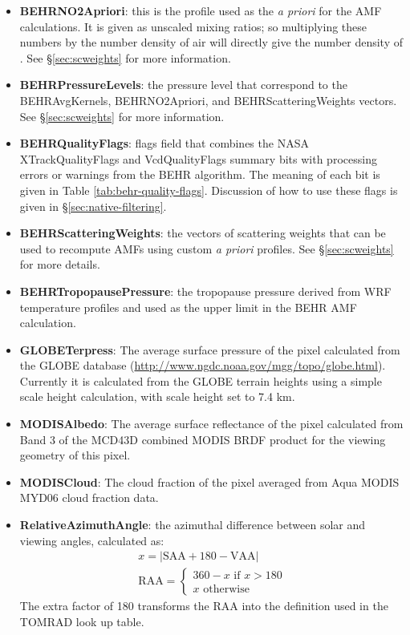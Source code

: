 \documentclass[12pt]{article}
\begin{document}
\begin{itemize}
	\item \textbf{BEHRNO2Apriori}: this is the  profile used as the \emph{a priori} for the AMF calculations. It is given as unscaled mixing ratios; so multiplying these numbers by the number density of air will directly give the number density of . See \S\ref{sec:scweights} for more information.
	
	\item \textbf{BEHRPressureLevels}: the pressure level that correspond to the BEHRAvgKernels, BEHRNO2Apriori, and BEHRScatteringWeights vectors. See \S\ref{sec:scweights} for more information.
	
	\item \textbf{BEHRQualityFlags}: flags field that combines the NASA XTrackQualityFlags and VcdQualityFlags summary bits with processing errors or warnings from the BEHR algorithm. The meaning of each bit is given in Table \ref{tab:behr-quality-flags}. Discussion of how to use these flags is given in \S\ref{sec:native-filtering}.
	
	\item \textbf{BEHRScatteringWeights}: the vectors of scattering weights that can be used to recompute AMFs using custom \emph{a priori} profiles. See \S\ref{sec:scweights} for more details.
	
	\item \textbf{BEHRTropopausePressure}: the tropopause pressure derived from WRF temperature profiles and used as the upper limit in the BEHR AMF calculation.
	
	\item \textbf{GLOBETerpress}: The average surface pressure of the pixel calculated from the GLOBE database (\url{http://www.ngdc.noaa.gov/mgg/topo/globe.html}). Currently it is calculated from the GLOBE terrain heights using a simple scale height calculation, with scale height set to 7.4 km.
	
	
	\item \textbf{MODISAlbedo}: The average surface reflectance of the pixel calculated from Band 3 of the MCD43D combined MODIS BRDF product for the viewing geometry of this pixel. 
	
	\item \textbf{MODISCloud}: The cloud fraction of the pixel averaged from Aqua MODIS MYD06 cloud fraction data.
	
	\item \textbf{RelativeAzimuthAngle}: the azimuthal difference between solar and viewing angles, calculated as:
	\begin{align*}
		x = |\mathrm{SAA} + 180 - \mathrm{VAA}| \\
		\mathrm{RAA} = \left\{ 
				\begin{matrix}
					360 - x \text{ if } x > 180 \\
					x	\text{ otherwise}
				\end{matrix}
			\right.
	\end{align*}
	The extra factor of 180 transforms the RAA into the definition used in the TOMRAD look up table.
	

\end{itemize}
\end{document}
